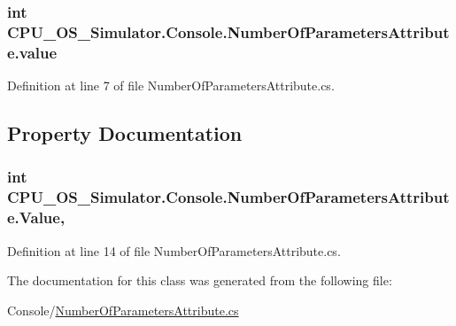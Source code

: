 \subsubsection[{value}]{\setlength{\rightskip}{0pt plus 5cm}int C\+P\+U\+\_\+\+O\+S\+\_\+\+Simulator.\+Console.\+Number\+Of\+Parameters\+Attribute.\+value\hspace{0.3cm}{\ttfamily [private]}}\label{class_c_p_u___o_s___simulator_1_1_console_1_1_number_of_parameters_attribute_a74f66203060602ef8135280692dc2064}


Definition at line 7 of file Number\+Of\+Parameters\+Attribute.\+cs.



\subsection{Property Documentation}
\hypertarget{class_c_p_u___o_s___simulator_1_1_console_1_1_number_of_parameters_attribute_a7e083af44b45e3e68868d0d5d1991000}{}
\subsubsection[{Value}]{\setlength{\rightskip}{0pt plus 5cm}int C\+P\+U\+\_\+\+O\+S\+\_\+\+Simulator.\+Console.\+Number\+Of\+Parameters\+Attribute.\+Value\hspace{0.3cm}{\ttfamily [get]}, {\ttfamily [set]}}\label{class_c_p_u___o_s___simulator_1_1_console_1_1_number_of_parameters_attribute_a7e083af44b45e3e68868d0d5d1991000}


Definition at line 14 of file Number\+Of\+Parameters\+Attribute.\+cs.



The documentation for this class was generated from the following file\+:\begin{DoxyCompactItemize}
\item 
Console/\hyperlink{_number_of_parameters_attribute_8cs}{Number\+Of\+Parameters\+Attribute.\+cs}\end{DoxyCompactItemize}
